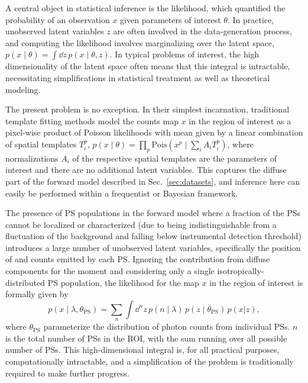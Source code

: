 \documentclass[prd,aps,10pt,nofootinbib,twocolumn,superscriptaddress,preprintnumbers,balancelastpage,longbibliography]{revtex4-1}
\begin{document}
A central object in statistical inference is the likelihood, which quantified the probability of an observation $x$ given parameters of interest $\theta$. In practice, unobserved latent variables $z$ are often involved in the data-generation process, and computing the likelihood involves marginalizing over the latent space, $p(x\mid\theta) = \int \dd z\,p(x\mid\theta, z)$. In typical problems of interest, the high dimensionality of the latent space often means that this integral is intractable, necessitating simplifications in statistical treatment as well as theoretical modeling. 

The present problem is no exception. In their simplest incarnation, traditional template fitting methods model the counts map $x$ in the region of interest as a pixel-wise product of Poisson likelihoods with mean given by a linear combination of spatial templates $T_i^p$, $p(x\mid \theta) = \prod_p \mathrm{Pois}\left(x^p\mid\sum_i A_i T_i^p\right)$, where normalizations $A_i$ of the respective spatial templates are the parameters of interest and there are no additional latent variables. This captures the diffuse part of the forward model described in Sec.~\ref{sec:datasets}, and inference here can easily be performed within a frequentist or Bayesian framework. 

The presence of PS populations in the forward model where a fraction of the PSs cannot be localized or characterized (due to being indistinguishable from a fluctuation of the background and falling below instrumental detection threshold) introduces a large number of unobserved latent variables, specifically the position of and counts emitted by each PS. Ignoring the contribution from diffuse components for the moment and considering only a single isotropically-distributed PS population, the likelihood for the map $x$ in the region of interest is formally given by
\begin{equation}
\label{eq:data_likelihood}
p(x\mid\lambda, \theta_\mathrm{PS}) = \sum_{n} \int \dd^{n} z \, p\left(n\mid\lambda\right)\,p(z\mid\theta_\mathrm{PS})\,p(x|z),
\end{equation}
where $\theta_\mathrm{PS}$ parameterize the distribution of photon counts from individual PSs. $n$ is the total number of PSs in the ROI, with the sum running over all possible number of PSs. This high-dimensional integral is, for all practical purposes, computationally intractable, and a simplification of the problem is traditionally required to make further progress.
\end{document}
